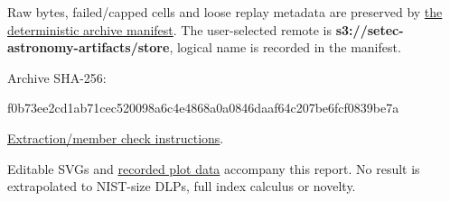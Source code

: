 \documentclass[
  10pt,
]{article}
\newenvironment{Shaded}{}{}
\newcommand{\NormalTok}[1]{#1}
\begin{document}
Raw bytes, failed/capped cells and loose replay metadata are preserved
by \href{../../../execution-v3/continue-20261026/RAW_ARTIFACTS.json}{the
deterministic archive manifest}. The user-selected remote is
\textbf{s3://setec-astronomy-artifacts/store}, logical name is recorded
in the manifest.

Archive SHA-256:

\begin{Shaded}
\begin{Highlighting}[]
\NormalTok{f0b73ee2cd1ab71cec520098a6c4e4868a0a0846daaf64c207be6fcf0839be7a}
\end{Highlighting}
\end{Shaded}

\href{../../../execution-v3/continue-20261026/README.md}{Extraction/member
check instructions}.

Editable SVGs and \href{PLOT_DATA.json}{recorded plot data} accompany
this report. No result is extrapolated to NIST-size DLPs, full index
calculus or novelty.
\end{document}
